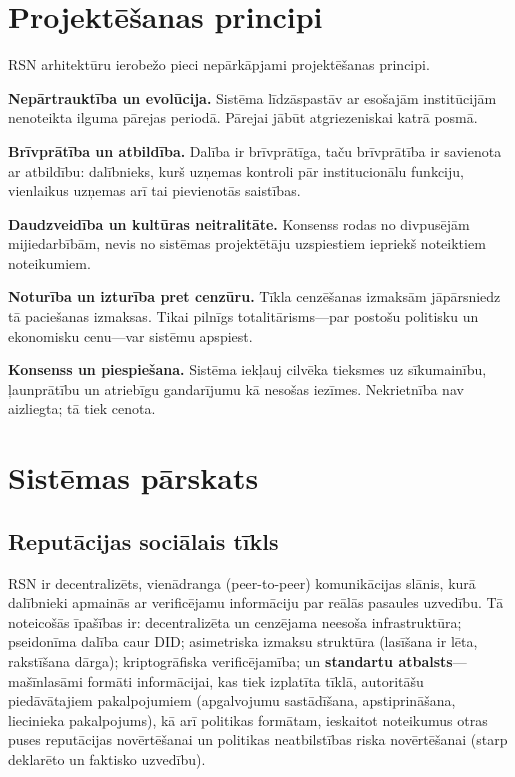 \documentclass[11pt,a4paper,twocolumn]{article}
\begin{document}
\section{Projektēšanas principi}

RSN arhitektūru ierobežo pieci nepārkāpjami projektēšanas principi.

\textbf{Nepārtrauktība un evolūcija.} Sistēma līdzāspastāv ar esošajām institūcijām nenoteikta ilguma pārejas periodā. Pārejai jābūt atgriezeniskai katrā posmā.

\textbf{Brīvprātība un atbildība.} Dalība ir brīvprātīga, taču brīvprātība ir savienota ar atbildību: dalībnieks, kurš uzņemas kontroli pār institucionālu funkciju, vienlaikus uzņemas arī tai pievienotās saistības.

\textbf{Daudzveidība un kultūras neitralitāte.} Konsenss rodas no divpusējām mijiedarbībām, nevis no sistēmas projektētāju uzspiestiem iepriekš noteiktiem noteikumiem.

\textbf{Noturība un izturība pret cenzūru.} Tīkla cenzēšanas izmaksām jāpārsniedz tā paciešanas izmaksas. Tikai pilnīgs totalitārisms---par postošu politisku un ekonomisku cenu---var sistēmu apspiest.

\textbf{Konsenss un piespiešana.} Sistēma iekļauj cilvēka tieksmes uz sīkumainību, ļaunprātību un atriebīgu gandarījumu kā nesošas iezīmes. Nekrietnība nav aizliegta; tā tiek cenota.

\section{Sistēmas pārskats}

\subsection{Reputācijas sociālais tīkls}

RSN ir decentralizēts, vienādranga (peer-to-peer) komunikācijas slānis, kurā dalībnieki apmainās ar verificējamu informāciju par reālās pasaules uzvedību. Tā noteicošās īpašības ir: decentralizēta un cenzējama neesoša infrastruktūra; pseidonīma dalība caur DID; asimetriska izmaksu struktūra (lasīšana ir lēta, rakstīšana dārga); kriptogrāfiska verificējamība; un \textbf{standartu atbalsts}---mašīnlasāmi formāti informācijai, kas tiek izplatīta tīklā, autoritāšu piedāvātajiem pakalpojumiem (apgalvojumu sastādīšana, apstiprināšana, liecinieka pakalpojums), kā arī politikas formātam, ieskaitot noteikumus otras puses reputācijas novērtēšanai un politikas neatbilstības riska novērtēšanai (starp deklarēto un faktisko uzvedību).
\end{document}
